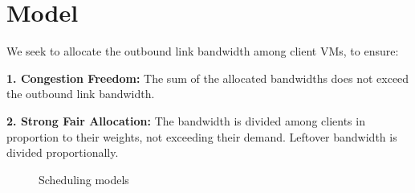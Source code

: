 \section{Model}
\label{sec:model}
We seek to allocate the outbound link bandwidth among client VMs, to ensure:  

{\bf 1. Congestion Freedom:}  The sum of the allocated bandwidths does not
exceed the outbound link bandwidth.

{\bf 2. Strong Fair Allocation: } The bandwidth is divided among clients in
proportion to their weights, not exceeding their demand. Leftover bandwidth is
divided proportionally.

\begin{figure}[t]
\center
{}
\vspace{-0.2em}
\caption{Scheduling models}
\label{fig:sched_mod}
\vspace{-0.5em}
\end{figure}


